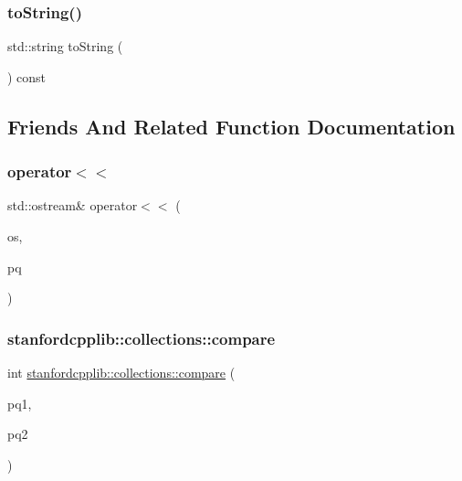 \mbox{\label{classPriorityQueue_a1fe5121d6528fdea3f243321b3fa3a49}} 
\subsubsection{\texorpdfstring{to\+String()}{toString()}}
{\footnotesize\ttfamily std\+::string to\+String (\begin{DoxyParamCaption}{ }\end{DoxyParamCaption}) const}



\subsection{Friends And Related Function Documentation}
\mbox{\label{classPriorityQueue_a533f07b48057f32ab7e31e23fdd21675}} 
\subsubsection{\texorpdfstring{operator$<$$<$}{operator<<}}
{\footnotesize\ttfamily std\+::ostream\& operator$<$$<$ (\begin{DoxyParamCaption}\item[{std\+::ostream \&}]{os,  }\item[{const \mbox{\hyperlink{classPriorityQueue}{Priority\+Queue}}$<$ T $>$ \&}]{pq }\end{DoxyParamCaption})\hspace{0.3cm}{\ttfamily [friend]}}

\mbox{\label{classPriorityQueue_ac12ad2761ec7037f8866b726424a81e2}} 
\subsubsection{\texorpdfstring{stanfordcpplib\+::collections\+::compare}{stanfordcpplib::collections::compare}}
{\footnotesize\ttfamily int \mbox{\hyperlink{namespacestanfordcpplib_1_1collections_a6d113dfaa3d28a3894990c64411ff03c}{stanfordcpplib\+::collections\+::compare}} (\begin{DoxyParamCaption}\item[{const Collection \&}]{pq1,  }\item[{const Collection \&}]{pq2 }\end{DoxyParamCaption})\hspace{0.3cm}{\ttfamily [friend]}}

